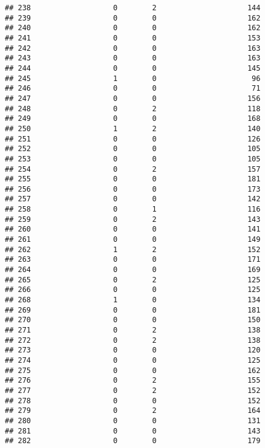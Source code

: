 \documentclass[]{article}
\begin{document}
\begin{verbatim}
## 238                   0        2                     144
## 239                   0        0                     162
## 240                   0        0                     162
## 241                   0        0                     153
## 242                   0        0                     163
## 243                   0        0                     163
## 244                   0        0                     145
## 245                   1        0                      96
## 246                   0        0                      71
## 247                   0        0                     156
## 248                   0        2                     118
## 249                   0        0                     168
## 250                   1        2                     140
## 251                   0        0                     126
## 252                   0        0                     105
## 253                   0        0                     105
## 254                   0        2                     157
## 255                   0        0                     181
## 256                   0        0                     173
## 257                   0        0                     142
## 258                   0        1                     116
## 259                   0        2                     143
## 260                   0        0                     141
## 261                   0        0                     149
## 262                   1        2                     152
## 263                   0        0                     171
## 264                   0        0                     169
## 265                   0        2                     125
## 266                   0        0                     125
## 268                   1        0                     134
## 269                   0        0                     181
## 270                   0        0                     150
## 271                   0        2                     138
## 272                   0        2                     138
## 273                   0        0                     120
## 274                   0        0                     125
## 275                   0        0                     162
## 276                   0        2                     155
## 277                   0        2                     152
## 278                   0        0                     152
## 279                   0        2                     164
## 280                   0        0                     131
## 281                   0        0                     143
## 282                   0        0                     179

\end{verbatim}
\end{document}
